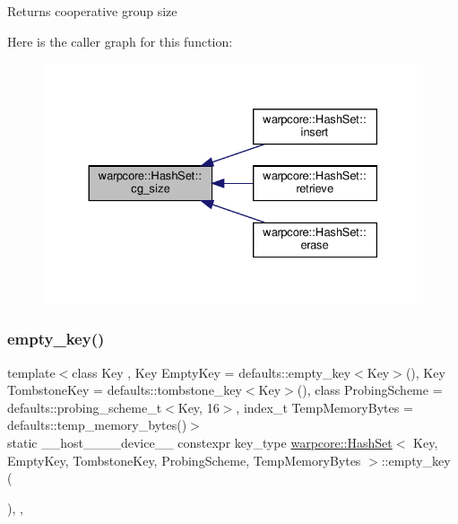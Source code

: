 \begin{DoxyReturn}{Returns}
cooperative group size 
\end{DoxyReturn}
Here is the caller graph for this function\+:
\nopagebreak
\begin{figure}[H]
\begin{center}
\leavevmode
\includegraphics[width=330pt]{classwarpcore_1_1HashSet_a0906259ae0be4a4f6f9ba74b4874e542_icgraph}
\end{center}
\end{figure}
\mbox{\label{classwarpcore_1_1HashSet_a6800547cc8ee14db6d97728af29b53fb}} 
\subsubsection{\texorpdfstring{empty\+\_\+key()}{empty\_key()}}
{\footnotesize\ttfamily template$<$class Key , Key Empty\+Key = defaults\+::empty\+\_\+key$<$\+Key$>$(), Key Tombstone\+Key = defaults\+::tombstone\+\_\+key$<$\+Key$>$(), class Probing\+Scheme  = defaults\+::probing\+\_\+scheme\+\_\+t$<$\+Key, 16$>$, index\+\_\+t Temp\+Memory\+Bytes = defaults\+::temp\+\_\+memory\+\_\+bytes()$>$ \\
static \+\_\+\+\_\+host\+\_\+\+\_\+\+\_\+\+\_\+device\+\_\+\+\_\+ constexpr key\+\_\+type \hyperlink{classwarpcore_1_1HashSet}{warpcore\+::\+Hash\+Set}$<$ Key, Empty\+Key, Tombstone\+Key, Probing\+Scheme, Temp\+Memory\+Bytes $>$\+::empty\+\_\+key (\begin{DoxyParamCaption}{ }\end{DoxyParamCaption})\hspace{0.3cm}{\ttfamily [inline]}, {\ttfamily [static]}, {\ttfamily [noexcept]}}



